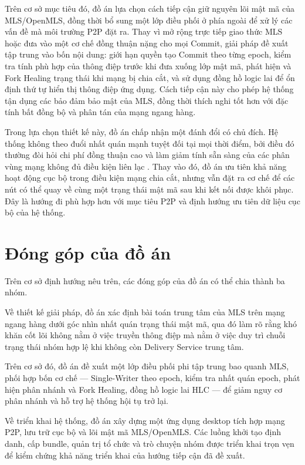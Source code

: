 \documentclass[../DoAn.tex]{subfiles}
\begin{document}
Trên cơ sở mục tiêu đó, đồ án lựa chọn cách tiếp cận giữ nguyên lõi mật mã của MLS/OpenMLS, đồng thời bổ sung một lớp điều phối ở phía ngoài để xử lý các vấn đề mà môi trường P2P đặt ra. Thay vì mở rộng trực tiếp giao thức MLS hoặc đưa vào một cơ chế đồng thuận nặng cho mọi Commit, giải pháp đề xuất tập trung vào bốn nội dung: giới hạn quyền tạo Commit theo từng epoch, kiểm tra tính phù hợp của thông điệp trước khi đưa xuống lớp mật mã, phát hiện và Fork Healing trạng thái khi mạng bị chia cắt, và sử dụng đồng hồ logic lai để ổn định thứ tự hiển thị thông điệp ứng dụng. Cách tiếp cận này cho phép hệ thống tận dụng các bảo đảm bảo mật của MLS, đồng thời thích nghi tốt hơn với đặc tính bất đồng bộ và phân tán của mạng ngang hàng.

Trong lựa chọn thiết kế này, đồ án chấp nhận một đánh đổi có chủ đích. Hệ thống không theo đuổi nhất quán mạnh tuyệt đối tại mọi thời điểm, bởi điều đó thường đòi hỏi chi phí đồng thuận cao và làm giảm tính sẵn sàng của các phân vùng mạng không đủ điều kiện liên lạc \cite{gilbert2002brewers}. Thay vào đó, đồ án ưu tiên khả năng hoạt động cục bộ trong điều kiện mạng chia cắt, nhưng vẫn đặt ra cơ chế để các nút có thể quay về cùng một trạng thái mật mã sau khi kết nối được khôi phục. Đây là hướng đi phù hợp hơn với mục tiêu P2P và định hướng ưu tiên dữ liệu cục bộ của hệ thống.

\section{Đóng góp của đồ án}
\label{sec:dong-gop}

Trên cơ sở định hướng nêu trên, các đóng góp của đồ án có thể chia thành ba nhóm.

Về thiết kế giải pháp, đồ án xác định bài toán trung tâm của MLS trên mạng ngang hàng dưới góc nhìn nhất quán trạng thái mật mã, qua đó làm rõ rằng khó khăn cốt lõi không nằm ở việc truyền thông điệp mà nằm ở việc duy trì chuỗi trạng thái nhóm hợp lệ khi không còn Delivery Service trung tâm.

Trên cơ sở đó, đồ án đề xuất một lớp điều phối phi tập trung bao quanh MLS, phối hợp bốn cơ chế — Single-Writer theo epoch, kiểm tra nhất quán epoch, phát hiện phân nhánh và Fork Healing, đồng hồ logic lai HLC — để giảm nguy cơ phân nhánh và hỗ trợ hệ thống hội tụ trở lại.

Về triển khai hệ thống, đồ án xây dựng một ứng dụng desktop tích hợp mạng P2P, lưu trữ cục bộ và lõi mật mã MLS/OpenMLS. Các luồng khởi tạo định danh, cấp bundle, quản trị tổ chức và trò chuyện nhóm được triển khai trọn vẹn để kiểm chứng khả năng triển khai của hướng tiếp cận đã đề xuất.
\end{document}
